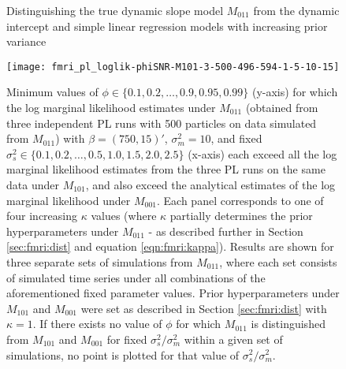 \begin{figure}
\ssp
\centering
\caption{Distinguishing the true dynamic slope model $M_{011}$ from the dynamic intercept and simple linear regression models with increasing prior variance} \label{fig:fmri:kappa:M011}
\texttt{[image: fmri\_pl\_loglik-phiSNR-M101-3-500-496-594-1-5-10-15]}
\caption*{Minimum values of $\phi \in \{0.1,0.2,\ldots,0.9,0.95,0.99\}$ (y-axis) for which the log marginal likelihood estimates under $M_{011}$ (obtained from three independent PL runs with 500 particles on data simulated from $M_{011}$) with $\beta = (750,15)'$, $\sigma^2_m = 10$, and fixed $\sigma^2_s \in \{0.1,0.2,\ldots,0.5,1.0,1.5,2.0,2.5\}$ (x-axis) each exceed all the log marginal likelihood estimates from the three PL runs on the same data under $M_{101}$, and also exceed the analytical estimates of the log marginal likelihood under $M_{001}$. Each panel corresponds to one of four increasing $\kappa$ values (where $\kappa$ partially determines the prior hyperparameters under $M_{011}$ - as described further in Section \ref{sec:fmri:dist} and equation \eqref{eqn:fmri:kappa}). Results are shown for three separate sets of simulations from $M_{011}$, where each set consists of simulated time series under all combinations of the aforementioned fixed parameter values. Prior hyperparameters under $M_{101}$ and $M_{001}$ were set as described in Section \ref{sec:fmri:dist} with $\kappa = 1$. If there exists no value of $\phi$ for which $M_{011}$ is distinguished from $M_{101}$ and $M_{001}$ for fixed $\sigma^2_s / \sigma^2_m$ within a given set of simulations, no point is plotted for that value of $\sigma^2_s / \sigma^2_m$.}
\end{figure}

